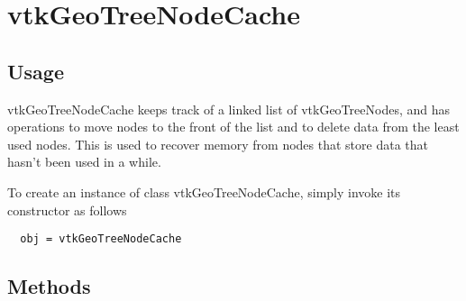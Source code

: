 \section{vtkGeoTreeNodeCache}

\subsection{Usage}

 vtkGeoTreeNodeCache keeps track of a linked list of vtkGeoTreeNodes,
 and has operations to move nodes to the front of the list and to
 delete data from the least used nodes. This is used to recover memory
 from nodes that store data that hasn't been used in a while.

To create an instance of class vtkGeoTreeNodeCache, simply
invoke its constructor as follows
\begin{verbatim}
  obj = vtkGeoTreeNodeCache
\end{verbatim}
\subsection{Methods}

